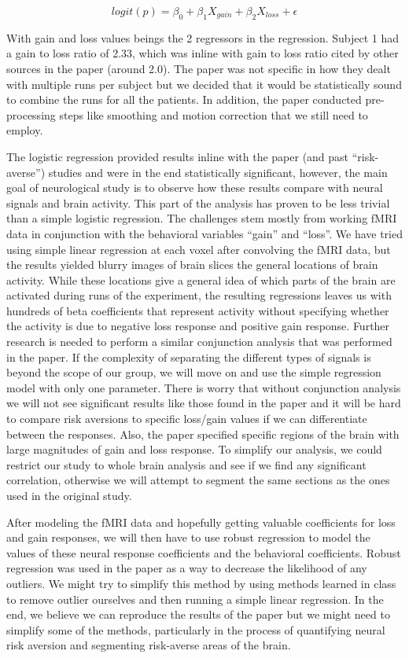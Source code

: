 \documentclass[11pt]{article}
\begin{document}
\[ logit(p) = \beta_0 + \beta_1 X_{gain} + \beta_2 X_{loss} + \epsilon \] 

With gain and loss values beings the 2 regressors in the regression. Subject 1
had a gain to loss ratio of 2.33, which was inline with gain to loss ratio
cited by other sources in the paper (around 2.0). The paper was not specific in
how they dealt with multiple runs per subject but we decided that it would be
statistically sound to combine the runs for all the patients. In addition, the
paper conducted pre-processing steps like smoothing and motion correction that
we still need to employ. 

The logistic regression provided results inline with the paper (and past
``risk-averse'') studies and were in the end statistically significant,
however, the main goal of neurological study is to observe how these results
compare with neural signals and brain activity. This part of the analysis has
proven to be less trivial than a simple logistic regression. The challenges
stem mostly from working fMRI data in conjunction with the behavioral variables
``gain'' and ``loss''. We have tried using simple linear regression at each
voxel after convolving the fMRI data, but the results yielded blurry images of
brain slices the general locations of brain activity. While these locations
give a general idea of which parts of the brain are activated during runs of
the experiment, the resulting regressions leaves us with hundreds of beta
coefficients that represent activity without specifying whether the activity is
due to negative loss response and positive gain response. Further research is
needed to perform a similar conjunction analysis that was performed in the
paper. If the complexity of separating the different types of signals is beyond
the scope of our group, we will move on and use the simple regression model
with only one parameter. There is worry that without conjunction analysis we
will not see significant results like those found in the paper and it will be
hard to compare risk aversions to specific loss/gain values if we can
differentiate between the responses. Also, the paper specified specific regions
of the brain with large magnitudes of gain and loss response. To simplify our
analysis, we could restrict our study to whole brain analysis and see if we
find any significant correlation, otherwise we will attempt to segment the same
sections as the ones used in the original study. 

After modeling the fMRI data and hopefully getting valuable coefficients for
loss and gain responses, we will then have to use robust regression to model
the values of these neural response coefficients and the behavioral
coefficients. Robust regression was used in the paper as a way to decrease the
likelihood of any outliers. We might try to simplify this method by using
methods learned in class to remove outlier ourselves and then running a simple
linear regression. In the end, we believe we can reproduce the results of the
paper but we might need to simplify some of the methods, particularly in the
process of quantifying neural risk aversion and segmenting risk-averse areas of
the brain.
\end{document}
